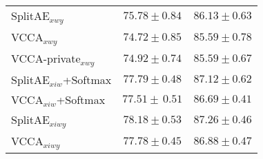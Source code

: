 \begin{table}[th!]
\begin{tabular}{l c c}
    \rowcolor{gray!30} 
    SplitAE$_{x w y}$ & $75.78 \pm 0.84$ & $86.13 \pm 0.63$ \\ 
    VCCA$_{x w y}$ & $74.72 \pm 0.85$ & $85.59 \pm 0.78$ \\ 
    \rowcolor{gray!30}  
    VCCA-private$_{x w y}$ & $74.92 \pm 0.74$ & $85.59 \pm 0.67$ \\
    \hline
    SplitAE$_{x i w}$+Softmax & $77.79 \pm 0.48$ & $87.12 \pm 0.62$ \\
    \rowcolor{gray!30}  
    VCCA$_{x i w}$+Softmax & $77.51 \pm \, 0.51$ & $86.69 \pm 0.41$ \\   
    \hline
    SplitAE$_{x i w y}$  & $78.18 \pm 0.53$ & $87.26 \pm 0.46$ \\ 
    \rowcolor{gray!30}
    VCCA$_{x i w y}$ &  $77.78 \pm 0.45$ & $86.88 \pm 0.47$ \\
    \hline 
\end{tabular}
\label{tab:classification_results_on_test_set}
\end{table}
